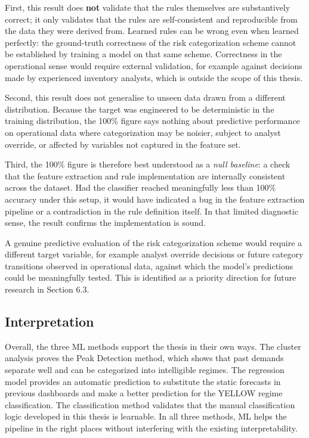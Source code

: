 First, this result does \textbf{not} validate that the rules themselves are substantively correct; it only validates that the rules are self-consistent and reproducible from the data they were derived from. Learned rules can be wrong even when learned perfectly: the ground-truth correctness of the risk categorization scheme cannot be established by training a model on that same scheme. Correctness in the operational sense would require external validation, for example against decisions made by experienced inventory analysts, which is outside the scope of this thesis.

Second, this result does not generalise to unseen data drawn from a different distribution. Because the target was engineered to be deterministic in the training distribution, the 100\% figure says nothing about predictive performance on operational data where categorization may be noisier, subject to analyst override, or affected by variables not captured in the feature set.

Third, the 100\% figure is therefore best understood as a \emph{null baseline}: a check that the feature extraction and rule implementation are internally consistent across the dataset. Had the classifier reached meaningfully less than 100\% accuracy under this setup, it would have indicated a bug in the feature extraction pipeline or a contradiction in the rule definition itself. In that limited diagnostic sense, the result confirms the implementation is sound.

A genuine predictive evaluation of the risk categorization scheme would require a different target variable, for example analyst override decisions or future category transitions observed in operational data, against which the model's predictions could be meaningfully tested. This is identified as a priority direction for future research in Section 6.3.

\subsection{Interpretation}

Overall, the three ML methods support the thesis in their own ways. The cluster analysis proves the Peak Detection method, which shows that past demands separate well and can be categorized into intelligible regimes. The regression model provides an automatic prediction to substitute the static forecasts in previous dashboards and make a better prediction for the YELLOW regime classification. The classification method validates that the manual classification logic developed in this thesis is learnable. In all three methods, ML helps the pipeline in the right places without interfering with the existing interpretability.
